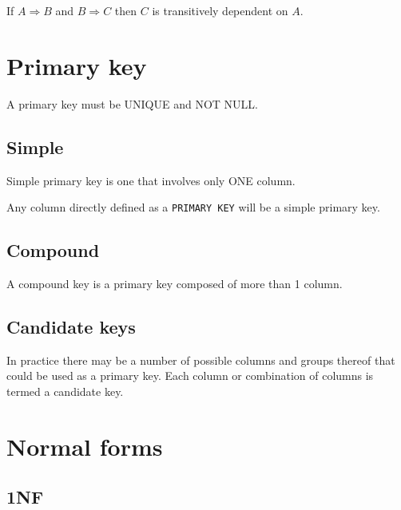 \documentclass[slides]{pgnotes}
\begin{document}
If \(A \Rightarrow B\) and \(B \Rightarrow C\) then \(C\) is
transitively dependent on \(A\).

\section{Primary key}\label{primary-key}

A primary key must be UNIQUE and NOT NULL.

\subsection{Simple}\label{simple}

Simple primary key is one that involves only ONE column.

Any column directly defined as a \texttt{PRIMARY\ KEY} will be a simple
primary key.

\subsection{Compound}\label{compound}

A compound key is a primary key composed of more than 1 column.

\subsection{Candidate keys}\label{candidate-keys}

In practice there may be a number of possible columns and groups thereof
that could be used as a primary key. Each column or combination of
columns is termed a candidate key.

\section{Normal forms}\label{normal-forms}

\subsection{1NF}\label{nf}
\end{document}
